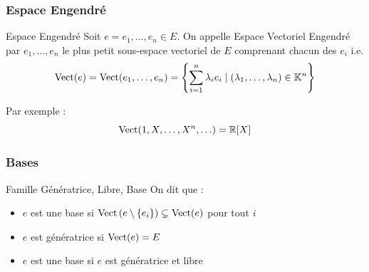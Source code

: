 \documentclass{beamercours}
\begin{document}
\begin{frame}
\frametitle{Espace Engendré}
\begin{définition}{Espace Engendré}{}
Soit $e = e_{1}, \ldots, e_{n} \in E$. On appelle Espace Vectoriel Engendré par $e_{1},\ldots, e_{n}$ le plus petit sous-espace vectoriel de $E$ comprenant chacun des $e_{i}$ i.e.
\[
    \operatorname{Vect}(e) = \operatorname{Vect}(e_{1}, \ldots, e_{n}) = \left\{\sum_{i = 1}^{n} \lambda_{i}e_{i} \mid \left(\lambda_{1}, \ldots, \lambda_{n}\right) \in \mathbb{K}^{n}\right\}
\]
\end{définition}
Par exemple : \vspace{-10pt}
\[
    \operatorname{Vect}(1, X, \ldots, X^{n}, \ldots) = \mathbb{R}[X]
\]
\end{frame}

\begin{frame}
\frametitle{Bases}
\begin{définition}{Famille Génératrice, Libre, Base}{}
On dit que :
\begin{itemize}[<+->]
    \item $e$ est une base si $\operatorname{Vect}\left(e \setminus \{e_{i}\}\right) \subsetneq \operatorname{Vect}(e)$ pour tout $i$
    \item $e$ est génératrice si $\operatorname{Vect}(e) = E$
    \item $e$ est une base si $e$ est génératrice et libre
\end{itemize}
\end{définition}
\end{frame}
\end{document}
